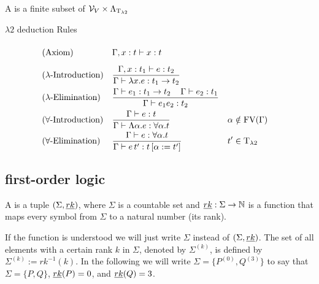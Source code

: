\begin{definition} 
	A  is a finite subset of $\mathcal{V}_V\times\Lambda_{\text{T}_{\lambda2}}$ %
\end{definition}
$\lambda2$ deduction Rules
\begin{mdframed} 
	\begingroup
	\addtolength{\jot}{0.3cm}
	\begin{align*}
		&(\text{Axiom}) &&\Gamma,x:t\vdash x:t\vphantom{\frac{t_1}{t_1}}\\
		&(\lambda\text{-Introduction}) &&\frac{\Gamma,x:t_1\vdash e:t_2}{\Gamma\vdash \lambda x.e:t_1\to t_2}\\
		&(\lambda\text{-Elimination}) &&\frac{\Gamma\vdash e_1:t_1\to t_2 \hspace{0.4cm}\Gamma\vdash e_2:t_1}{\Gamma\vdash e_1e_2:t_2}\\
& (\forall\text{-Introduction}) &   & \frac{\Gamma\vdash e:t}{\Gamma\vdash \Lambda\alpha.e:\forall\alpha.t}                 &   & \alpha\notin\FV(\Gamma) \\
& (\forall\text{-Elimination})  &   & \frac{\Gamma\vdash e:\forall\alpha.t }{\Gamma\vdash e\,t':t\left[ \alpha:=t'\right] } &   & t'\in\lambdaTypes %
	\end{align*}
	\endgroup
\end{mdframed}

\subsection{first-order logic}
\begin{definition}
	A  is a tuple $(\Sigma,\emph{rk})$, where $\Sigma$ is a countable set and $\emph{rk}:\Sigma\to\mathbb{N}$ is a function that maps every symbol from $\Sigma$ to a natural number (its rank).
\end{definition}
If the function \rank{} is understood we will just write $\Sigma$ instead of $(\Sigma,\emph{rk})$. The set of all elements with a certain rank $k$ in $\Sigma$, denoted by $\Sigma^{(k)}$, is defined by $\Sigma^{(k)}:=rk^{-1}(k)$. In the following we will write $\Sigma=\{P^{(0)},Q^{(3)}\}$ to say that $\Sigma=\{P,Q\}$, $\emph{rk}(P)=0$, and $\emph{rk}(Q)=3$.

